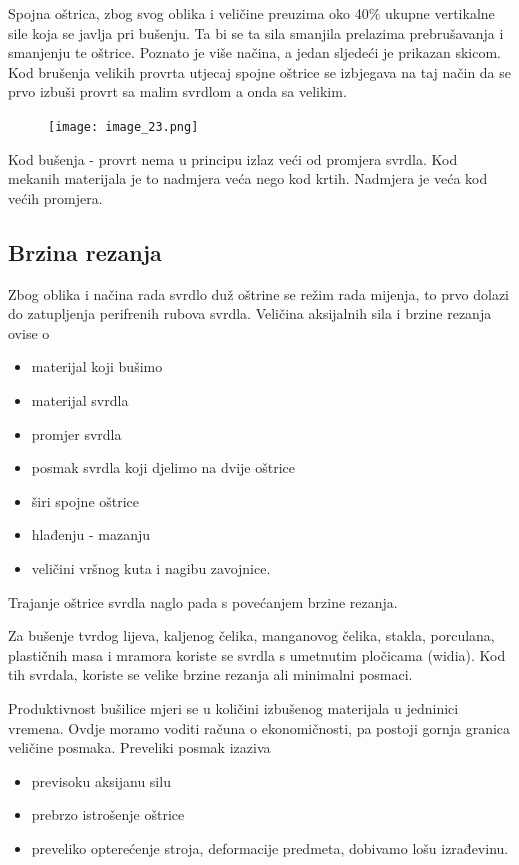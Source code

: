 \documentclass[a4paper,12pt]{article}
\numberwithin{figure}{section}
\begin{document}
Spojna oštrica, zbog svog oblika i veličine preuzima oko 40\% ukupne vertikalne sile koja se javlja pri bušenju. Ta bi se ta sila smanjila prelazima prebrušavanja i smanjenju te oštrice. Poznato je više načina, a jedan sljedeći je prikazan skicom.
Kod brušenja velikih provrta utjecaj spojne oštrice se izbjegava na taj način da se prvo izbuši provrt sa malim svrdlom a onda sa velikim.
\begin{figure}[!h]
\centering
\texttt{[image: image\_23.png]}
\end{figure}
\FloatBarrier
Kod bušenja - provrt nema u principu izlaz veći od promjera svrdla. Kod mekanih materijala je to nadmjera veća nego kod krtih. Nadmjera je veća kod većih promjera.
\subsection{Brzina rezanja}
Zbog oblika i načina rada svrdlo duž oštrine se režim rada mijenja, to prvo dolazi do zatupljenja perifrenih rubova svrdla. Veličina aksijalnih sila i brzine rezanja ovise o 
\begin{itemize}
\item materijal koji bušimo
\item materijal svrdla
\item promjer svrdla
\item posmak svrdla koji djelimo na dvije oštrice
\item širi spojne oštrice 
\item hlađenju - mazanju
\item veličini vršnog kuta i nagibu zavojnice.
\end{itemize}
Trajanje oštrice svrdla naglo pada s povećanjem brzine rezanja.\par
Za bušenje tvrdog lijeva, kaljenog čelika, manganovog čelika, stakla, porculana, plastičnih masa i mramora koriste se svrdla s umetnutim pločicama (widia). Kod tih svrdala, koriste se velike brzine rezanja ali minimalni posmaci.\par
Produktivnost bušilice mjeri se u količini izbušenog materijala u jedninici vremena. Ovdje moramo voditi računa o ekonomičnosti, pa postoji gornja granica veličine posmaka. Preveliki posmak izaziva
\begin{itemize}
\item previsoku aksijanu silu
\item prebrzo istrošenje oštrice
\item preveliko opterećenje stroja, deformacije predmeta, dobivamo lošu izrađevinu.
\end{itemize}
\end{document}
